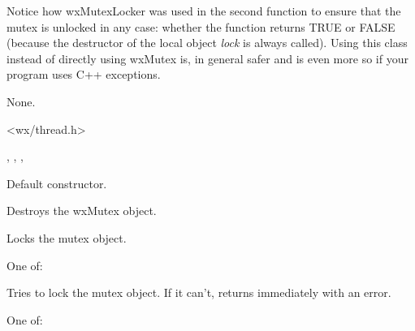Notice how wxMutexLocker was used in the second function to ensure that the
mutex is unlocked in any case: whether the function returns TRUE or FALSE
(because the destructor of the local object {\it lock} is always called). Using
this class instead of directly using wxMutex is, in general safer and is even
more so if your program uses C++ exceptions.


None.


<wx/thread.h>


, , 
, 


\label{wxmutexconstr}


Default constructor.



Destroys the wxMutex object.

\label{wxmutexlock}


Locks the mutex object.


One of:

\twocolwidtha{7cm}
\begin{twocollist}\itemsep=0pt
\end{twocollist}

\label{wxmutextrylock}


Tries to lock the mutex object. If it can't, returns immediately with an error.


One of:

\twocolwidtha{7cm}
\begin{twocollist}\itemsep=0pt
\end{twocollist}

